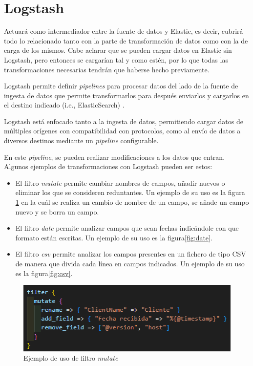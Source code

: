 \section{Logstash}
Actuará como intermediador entre la fuente de datos y Elastic, es decir, cubrirá todo lo relacionado tanto con la parte de transformación de datos como con la de carga de los mismos. Cabe aclarar que se pueden cargar datos en Elastic sin Logstash, pero entonces se cargarían tal y como estén, por lo que todas las transformaciones necesarias tendrán que haberse hecho previamente. 

Logstash permite definir \textit{pipelines} para procesar datos del lado de la fuente de ingesta de datos que permite transformarlos para después enviarlos y cargarlos en el destino indicado (i.e., ElasticSearch) \cite{Logstash}.

Logstash está enfocado tanto a la ingesta de datos, permitiendo cargar datos de múltiples orígenes con compatibilidad con protocolos, como al envío de datos a diversos destinos mediante un \textit{pipeline} configurable.

En este \textit{pipeline}, se pueden realizar modificaciones a los datos que entran. Algunos ejemplos de transformaciones con Logstash pueden ser estos:
\begin{itemize}
    \item El filtro \textit{mutate} permite cambiar nombres de campos, añadir nuevos o eliminar los que se consideren reduntantes. Un ejemplo de su uso es la figura \ref{fig:mutate} en la cuál se realiza un cambio de nombre de un campo, se añade un campo nuevo y se borra un campo.
    \item El filtro \textit{date} permite analizar campos que sean fechas indicándole con que formato están escritas. Un ejemplo de su uso es la figura\ref{fig:date}.
    \item El filtro \textit{csv} permite analizar los campos presentes en un fichero de tipo CSV de manera que divida cada línea en campos indicados. Un ejemplo de su uso es la figura\ref{fig:csv}.

\end{itemize}

\begin{figure}
    \centering
    \includegraphics[width=1\linewidth]{img/mutate.png}
    \caption{Ejemplo de uso de filtro \textit{mutate}}
    \label{fig:mutate}
\end{figure}

